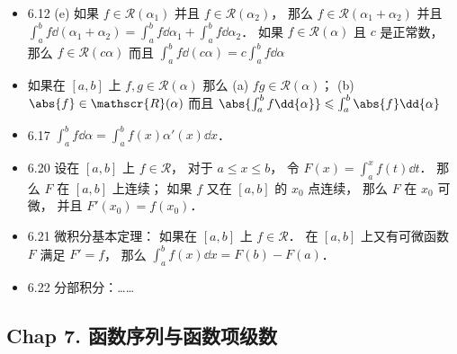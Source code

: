 \begin{itemize}
\item 6.12 (e) 如果 $f\in \mathscr{R}(\alpha_1)$ 并且 $f\in \mathscr{R}(\alpha_2)$， 那么 $f\in \mathscr{R}(\alpha_1+\alpha_2)$ 并且 $\int_a^bf\dd{(\alpha_1+\alpha_2)} = \int_a^bf\dd{\alpha_1}+ \int_a^bf\dd{\alpha_2}$． 如果 $f\in \mathscr{R}(\alpha)$ 且 $c$ 是正常数， 那么 $f\in \mathscr{R}(c\alpha)$ 而且 $\int_a^bf\dd{(c\alpha)} = c\int_a^bf\dd{\alpha}$

\item 如果在 $[a,b]$ 上 $f,g\in \mathscr{R}(\alpha)$ 那么 (a) $fg\in \mathscr{R}(\alpha)$； (b) $\abs{f}\in \mathscr{R}(\alpha)$ 而且 $\abs{\int_a^bf\dd{\alpha}} \leqslant \int_a^b\abs{f}\dd{\alpha}$

\item 6.17 $\int_a^b f\dd{\alpha} = \int_a^b f(x)\alpha'(x)\dd{x}$．

\item 6.20 设在 $[a,b]$ 上 $f\in \mathscr{R}$， 对于 $a\leqslant x\leqslant b$， 令 $F(x) = \int_a^x f(t)\dd{t}$． 那么 $F$ 在 $[a,b]$ 上连续； 如果 $f$ 又在 $[a,b]$ 的 $x_0$ 点连续， 那么 $F$ 在 $x_0$ 可微， 并且 $F'(x_0) = f(x_0)$．

\item 6.21 微积分基本定理： 如果在 $[a,b]$ 上 $f\in \mathscr{R}$． 在 $[a,b]$ 上又有可微函数 $F$ 满足 $F' = f$， 那么 $\int_a^b f(x)\dd{x} = F(b)-F(a)$．

\item 6.22 分部积分：……
\end{itemize}

\subsection{Chap 7. 函数序列与函数项级数}

